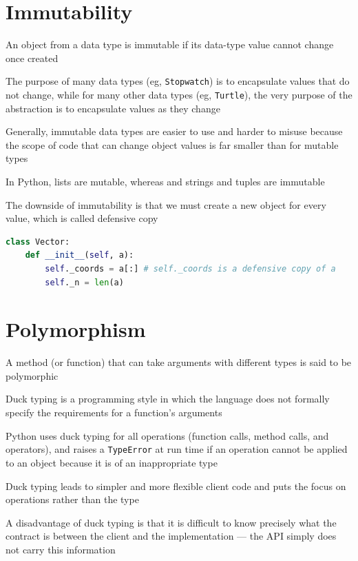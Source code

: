 \documentclass[8pt,a4paper,compress]{beamer}
\begin{document}
\section{Immutability}
\begin{frame}[fragile]
\pause

An object from a data type is immutable if its data-type value cannot change once created

\pause
\bigskip

The purpose of many data types (eg, \lstinline{Stopwatch}) is to encapsulate values that do not change, while for many other data types (eg, \lstinline{Turtle}), the very purpose of the abstraction is to encapsulate values as they change 

\pause
\bigskip

Generally, immutable data types are easier to use and harder to misuse because the scope of code that can change object values is far smaller than for mutable types

\pause
\bigskip

In Python, lists are mutable, whereas and strings and tuples are immutable

\pause
\bigskip

The downside of immutability is that we must create a new object for every value, which is called defensive copy

\begin{lstlisting}[language=Python,style=focusin]
class Vector:
    def __init__(self, a):
        self._coords = a[:] # self._coords is a defensive copy of a
        self._n = len(a)
\end{lstlisting}
\end{frame}

\section{Polymorphism}
\begin{frame}[fragile]
\pause

A method (or function) that can take arguments with different types is said to be polymorphic

\pause
\bigskip

Duck typing is a programming style in which the language does not formally specify the requirements for a function's arguments

\pause
\bigskip

Python uses duck typing for all operations (function calls, method calls, and operators), and raises a \lstinline{TypeError} at run time if an operation cannot be applied to an object because it is of an inappropriate type

\pause
\bigskip

Duck typing leads to simpler and more flexible client code and puts the focus on operations rather than the type

\pause
\bigskip

A disadvantage of duck typing is that it is difficult to know precisely what the contract is between the client and the implementation --- the API simply does not carry this information
\end{frame}
\end{document}
